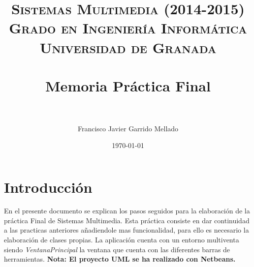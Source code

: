 


\title{	
\normalfont \normalsize 
\textsc{{\bf Sistemas Multimedia (2014-2015)} \\ Grado en Ingeniería Informática \\ Universidad de Granada} \\ [25pt] %
\horrule{0.5pt} \\[0.4cm] %
\huge Memoria Práctica Final  \\ %
\horrule{2pt} \\[0.5cm] %
}

\author{Francisco Javier Garrido Mellado} %

\date{\normalsize\today} %




\maketitle %

\newpage %

\tableofcontents %

\listoffigures


\newpage
\section{Introducción }
En el presente documento se explican los pasos seguidos para la elaboración de la práctica Final de Sistemas Multimedia. Esta práctica consiste en dar continuidad a las practicas anteriores añadiendole mas funcionalidad, para ello es necesario la elaboración de clases propias.
La aplicación cuenta con un entorno multiventa siendo \emph{VentanaPrincipal} la ventana que cuenta con las diferentes barras de herramientas.
\textbf{Nota: El proyecto UML se ha realizado con Netbeans.}
